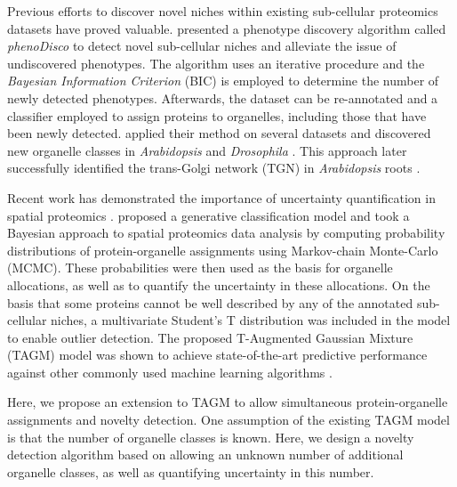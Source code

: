 \documentclass[12pt,english]{article}
\begin{document}
Previous efforts to discover novel niches within existing sub-cellular proteomics datasets have proved valuable. \cite{Breckels:2013} presented a phenotype discovery algorithm called \textit{phenoDisco} to detect novel sub-cellular niches and alleviate the issue of undiscovered phenotypes. The algorithm uses an iterative procedure and the \textit{Bayesian Information Criterion} (BIC) \citep{Schwarz::1978} is employed to determine the number of newly detected phenotypes. Afterwards, the dataset can be re-annotated and a classifier employed to assign proteins to organelles, including those that have been newly detected. \cite{Breckels:2013} applied their method on several datasets and discovered new organelle classes in \textit{Arabidopsis} \citep{Dunkley:2006} and \textit{Drosophila} \citep{Tan:2009}. This approach later successfully identified the trans-Golgi network (TGN) in \textit{Arabidopsis} roots \citep{Groen:2014}.

Recent work has demonstrated the importance of uncertainty quantification in spatial proteomics \citep{Crook:2018,Crook::2019b, Crook::2019a}. \cite{Crook:2018} proposed a generative classification model and took a Bayesian approach to spatial proteomics data analysis by computing probability distributions of protein-organelle assignments using Markov-chain Monte-Carlo (MCMC). These probabilities were then used as the basis for organelle allocations, as well as to quantify the uncertainty in these allocations. On the basis that some proteins cannot be well described by any of the annotated sub-cellular niches, a multivariate Student's T distribution was included in the model to enable outlier detection. The proposed T-Augmented Gaussian Mixture (TAGM) model was shown to achieve state-of-the-art predictive performance against other commonly used machine learning algorithms \citep{Crook:2018}. 

Here, we propose an extension to TAGM to allow simultaneous protein-organelle assignments and novelty detection. One assumption of the existing TAGM model is that the number of organelle classes is known. Here, we design a novelty detection algorithm based on allowing an unknown number of additional organelle classes, as well as quantifying uncertainty in this number.
\end{document}
